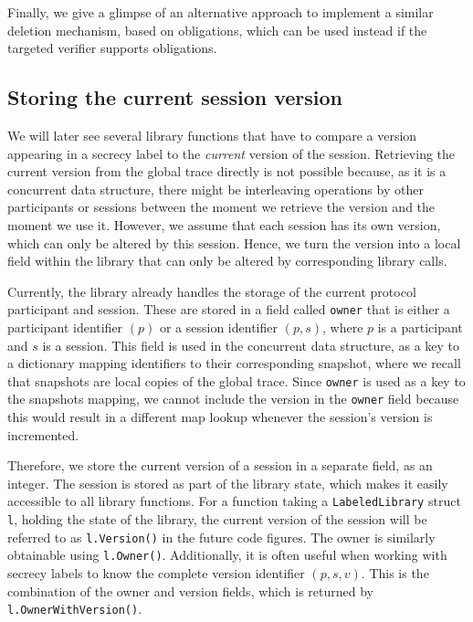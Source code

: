 Finally, we give a glimpse of an alternative approach to implement a similar deletion mechanism, based on obligations, which can be used instead if the targeted verifier supports obligations.

\subsection{Storing the current session version}
\label{sec:storing-the-current-session-version}

We will later see several library functions that have to compare a version appearing in a secrecy label to the \emph{current} version of the session.
Retrieving the current version from the global trace directly is not possible because, as it is a concurrent data structure, there might be interleaving operations by other participants or sessions between the moment we retrieve the version and the moment we use it.
However, we assume that each session has its own version, which can only be altered by this session.
Hence, we turn the version into a local field within the library that can only be altered by corresponding library calls.

Currently, the library already handles the storage of the current protocol participant and session.
These are stored in a field called \texttt{owner} that is either a participant identifier $(p)$ or a session identifier $(p,s)$, where $p$ is a participant and $s$ is a session.
This field is used in the concurrent data structure, as a key to a dictionary mapping identifiers to their corresponding snapshot, where we recall that snapshots are local copies of the global trace.
Since \texttt{owner} is used as a key to the snapshots mapping, we cannot include the version in the \texttt{owner} field because this would result in a different map lookup whenever the session's version is incremented.

Therefore, we store the current version of a session in a separate field, as an integer.
The session is stored as part of the library state, which makes it easily accessible to all library functions.
For a function taking a \texttt{LabeledLibrary} struct \texttt{l}, holding the state of the library, the current version of the session will be referred to as \texttt{l.Version()} in the future code figures.
The owner is similarly obtainable using \texttt{l.Owner()}.
Additionally, it is often useful when working with secrecy labels to know the complete version identifier $(p,s,v)$. This is the combination of the owner and version fields, which is returned by \texttt{l.OwnerWithVersion()}.

